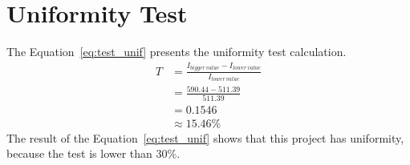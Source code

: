 \section{Uniformity Test}
The Equation~\ref{eq:test_unif} presents the uniformity test calculation.
\begin{equation}
\begin{split}
T &= \frac{I_{bigger\,value} - I_{lower\,value}}{I_{lower\,value}} \\
 &= \frac{590.44 - 511.39}{511.39} \\
 & = 0.1546 \\
 & \approx 15.46\%
\end{split}
\label{eq:test_unif}
\end{equation}
The result of the Equation~\ref{eq:test_unif} shows that this project has uniformity, because the test is lower than $30\%$.



